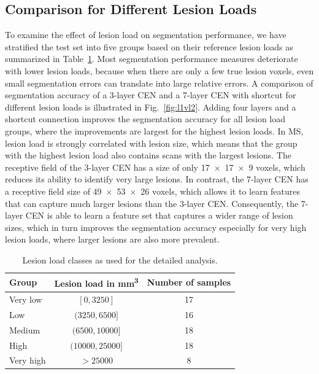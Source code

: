 \subsection{Comparison for Different Lesion Loads}

To examine the effect of lesion load on segmentation performance, we have
stratified the test set into five groups based on their reference lesion loads
as summarized in Table~\ref{tab:groups}. Most segmentation performance measures
deteriorate with lower lesion loads, because when there are only a few true
lesion voxels, even small segmentation errors can translate into large relative
errors. A comparison of segmentation accuracy of a 3-layer CEN and a 7-layer CEN
with shortcut for different lesion loads is illustrated in
Fig.~\ref{fig:l1vl2}. Adding four layers and a shortcut connection improves the
segmentation accuracy for all lesion load groups, where the improvements are
largest for the highest lesion loads. In MS, lesion load is strongly
correlated with lesion size, which means that the group with the highest lesion
load also contains scans with the largest lesions. The receptive field of the
3-layer CEN has a size of only \num{17x17x9} voxels, which reduces its ability
to identify very large lesions. In contrast, the 7-layer CEN has a receptive
field size of \num{49x53x26} voxels, which allows it to learn features that can
capture much larger lesions than the 3-layer CEN. Consequently, the 7-layer CEN
is able to learn a feature set that captures a wider range of lesion sizes,
which in turn improves the segmentation accuracy especially for very high lesion
loads, where larger lesions are also more prevalent.

\begin{table}[tb]
\caption{Lesion load classes as used for the detailed analysis.}
\label{tab:groups}
\centering
\begin{tabular}{@{}lcc@{}}
\toprule
Group & Lesion load in \si{\cubic\milli\metre} & Number of samples \\
\midrule
Very low & $[0,3250]$ & 17 \\
Low      & $(3250,6500]$ & 16 \\
Medium & $(6500,10000]$ & 18 \\
High & $(10000,25000]$ & 18 \\
Very high & $> 25000$ & 8 \\
\bottomrule
\end{tabular}
\end{table}

